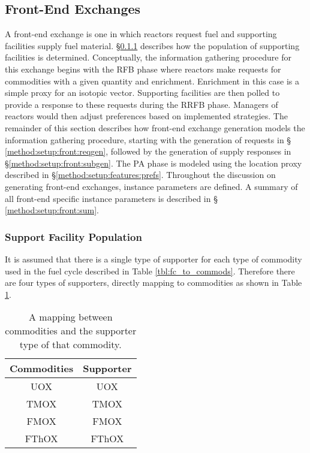 \subsection{Front-End Exchanges}\label{method:setup:front}

A front-end exchange is one in which reactors request fuel and supporting
facilities supply fuel material. \S \ref{method:setup:front:sup} describes how
the population of supporting facilities is determined. Conceptually, the
information gathering procedure for this exchange begins with the RFB phase
where reactors make requests for commodities with a given quantity and
enrichment. Enrichment in this case is a simple proxy for an isotopic
vector. Supporting facilities are then polled to provide a response to these
requests during the RRFB phase. Managers of reactors would then adjust
preferences based on implemented strategies. The remainder of this section
describes how front-end exchange generation models the information gathering
procedure, starting with the generation of requests in \S
\ref{method:setup:front:reqgen}, followed by the generation of supply responses
in \S \ref{method:setup:front:subgen}. The PA phase is modeled using the
location proxy described in \S \ref{method:setup:features:prefs}. Throughout the
discussion on generating front-end exchanges, instance parameters are defined. A
summary of all front-end specific instance parameters is described in \S
\ref{method:setup:front:sum}.

\subsubsection{Support Facility Population} \label{method:setup:front:sup}

It is assumed that there is a single type of supporter for each type of commodity
used in the fuel cycle described in Table \ref{tbl:fc_to_commods}. Therefore
there are four types of supporters, directly mapping to commodities as shown in
Table \ref{tbl:commod_to_sup}.

\begin{table}[h!]
\centering
\caption{A mapping between commodities and the supporter type of that commodity.}
\label{tbl:commod_to_sup}
\begin{tabular}{|c|c|}
\hline
Commodities            & Supporter \\ \hline
UOX                    & UOX         \\ \hline
TMOX                    & TMOX         \\ \hline
FMOX                    & FMOX         \\ \hline
FThOX                    & FThOX         \\ \hline
\end{tabular}
\end{table}

